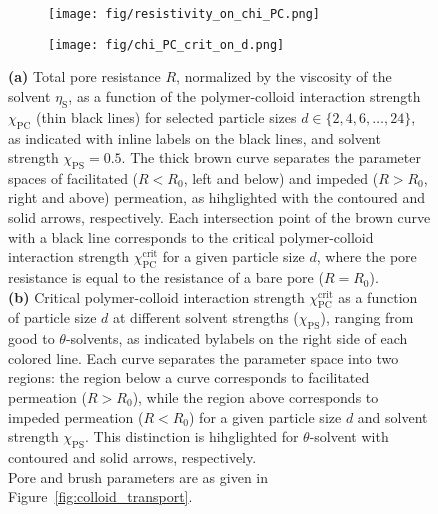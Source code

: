 \documentclass[12pt, a4paper]{article}
\begin{document}
\begin{figure}
    \centering
    \begin{subfigure}[b]{0.4\textwidth}
        \texttt{[image: fig/resistivity\_on\_chi\_PC.png]}
        \caption{}
    \end{subfigure}
    \hspace{0.03\textwidth}
    \begin{subfigure}[b]{0.52\textwidth}
        \texttt{[image: fig/chi\_PC\_crit\_on\_d.png]}
        \caption{}
    \end{subfigure}%
    \caption{
        \textbf{(a)} Total pore resistance $R$, normalized by the viscosity of the solvent $\eta_\text{S}$, as a function of the polymer-colloid interaction strength $\chi_{\text{PC}}$ (thin black lines) for selected particle sizes $d \in \{2, 4, 6, \dots, 24\}$, as indicated with inline labels on the black lines, and solvent strength $\chi_{\text{PS}}=0.5$.
        The thick brown curve separates the parameter spaces of facilitated ($R < R_{0}$, left and below) and impeded ($R > R_{0}$, right and above) permeation, as hihglighted with the contoured and solid arrows, respectively.
        Each intersection point of the brown curve with a black line corresponds to the critical polymer-colloid interaction strength $\chi_{\text{PC}}^{\text{crit}}$ for a given particle size $d$, where the pore resistance is equal to the resistance of a bare pore ($R = R_{0}$).
        \\
        \textbf{(b)} Critical polymer-colloid interaction strength $\chi_{\text{PC}}^{\text{crit}}$ as a function of particle size $d$ at different solvent strengths ($\chi_{\text{PS}}$), ranging from good to $\theta$-solvents, as indicated bylabels on the right side of each colored line.
        Each curve separates the parameter space into two regions: the region below a curve corresponds to facilitated permeation ($R > R_{0}$), while the region above corresponds to impeded permeation ($R < R_{0}$) for a given particle size $d$ and solvent strength $\chi_{\text{PS}}$.
        This distinction is hihglighted for $\theta$-solvent with contoured and solid arrows, respectively.
        \\
        Pore and brush parameters are as given in Figure~\ref{fig:colloid_transport}.
    }
    \label{fig:R_vs_chi_PC}
\end{figure}
\end{document}
